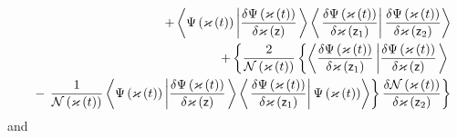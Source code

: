 \begin{eqnarray}
&&+\left\langle \Psi \left( {\cal \varkappa }\left( t\right) \right) \left| 
\frac{\delta \Psi \left( {\cal \varkappa }\left( t\right) \right) }{\delta 
{\cal \varkappa }\left( {\sf z}\right) }\right. \right\rangle \left\langle
\left. \frac{\delta \Psi \left( {\cal \varkappa }\left( t\right) \right) }{%
\delta {\cal \varkappa }\left( {\sf z}_{1}\right) }\right| \frac{\delta \Psi
\left( {\cal \varkappa }\left( t\right) \right) }{\delta \varkappa \left( 
{\sf z}_{2}\right) }\right\rangle  \nonumber \\
&&+\left\{ \frac{2}{{\cal N}\left( {\cal \varkappa }\left( t\right) \right) }%
\left\{ \left\langle \frac{\delta \Psi \left( {\cal \varkappa }\left(
t\right) \right) }{\delta {\cal \varkappa }\left( {\sf z}_{1}\right) }\left| 
\frac{\delta \Psi \left( {\cal \varkappa }\left( t\right) \right) }{\delta 
{\cal \varkappa }\left( {\sf z}\right) }\right. \right\rangle \right. \right.
\nonumber \\
&&-\left. \left. \frac{1}{{\cal N}\left( {\cal \varkappa }\left( t\right)
\right) }\left\langle \Psi \left( {\cal \varkappa }\left( t\right) \right)
\left| \frac{\delta \Psi \left( {\cal \varkappa }\left( t\right) \right) }{%
\delta {\cal \varkappa }\left( {\sf z}\right) }\right. \right\rangle
\left\langle \left. \frac{\delta \Psi \left( {\cal \varkappa }\left(
t\right) \right) }{\delta {\cal \varkappa }\left( {\sf z}_{1}\right) }%
\right| \Psi \left( {\cal \varkappa }\left( t\right) \right) \right\rangle
\right\} \frac{\delta {\cal N}\left( {\cal \varkappa }\left( t\right)
\right) }{\delta \varkappa \left( {\sf z}_{2}\right) }\right\}
\end{eqnarray}%
and 
